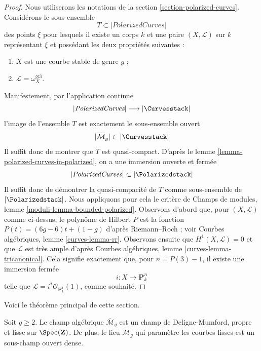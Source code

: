 \begin{proof}
Nous utiliserons les notations de la section \ref{section-polarized-curves}.
Considérons le sous-ensemble
$$
T \subset |\textit{PolarizedCurves}|
$$
des points $\xi$ pour lesquels il existe un corps $k$ et une paire
$(X, \mathcal{L})$ sur $k$ représentant $\xi$
et possédant les deux propriétés suivantes :
\begin{enumerate}
\item $X$ est une courbe stable de genre $g$ ;
\item $\mathcal{L} = \omega_X^{\otimes 3}$.
\end{enumerate}
Manifestement, par l'application continue
$$
|\textit{PolarizedCurves}|
\longrightarrow
|\Curvesstack|
$$
l'image de l'ensemble $T$ est exactement le sous-ensemble ouvert
$$
|\overline{\mathcal{M}}_g| \subset |\Curvesstack|
$$
Il suffit donc de montrer que $T$ est quasi-compact.
D'après le lemme \ref{lemma-polarized-curves-in-polarized}, on a une
immersion ouverte et fermée
$$
|\textit{PolarizedCurves}| \subset |\Polarizedstack|
$$
Il suffit donc de démontrer la quasi-compacité de $T$ comme sous-ensemble de
$|\Polarizedstack|$. Nous appliquons pour cela le critère de
Champs de modules, lemme \ref{moduli-lemma-bounded-polarized}.
Observons d'abord que, pour $(X, \mathcal{L})$
comme ci-dessus, le polynôme de Hilbert $P$ est la fonction
$P(t) = (6g - 6)t + (1 - g)$ d'après Riemann--Roch ; voir
Courbes algébriques, lemme \ref{curves-lemma-rr}.
Observons ensuite que $H^1(X, \mathcal{L}) = 0$
et que $\mathcal{L}$ est très ample d'après
Courbes algébriques, lemme \ref{curves-lemma-tricanonical}.
Cela signifie exactement que, pour $n = P(3) - 1$,
il existe une immersion fermée
$$
i : X \longrightarrow \mathbf{P}^n_k
$$
telle que $\mathcal{L} = i^*\mathcal{O}_{\mathbf{P}^1_k}(1)$,
comme souhaité.
\end{proof}

\noindent
Voici le théorème principal de cette section.

\begin{theorem}
\label{theorem-stable-smooth-proper}
Soit $g \geq 2$. Le champ algébrique $\overline{\mathcal{M}}_g$ est un
champ de Deligne-Mumford, propre et lisse sur $\Spec(\mathbf{Z})$.
De plus, le lieu $\mathcal{M}_g$ qui paramètre les courbes lisses
est un sous-champ ouvert dense.
\end{theorem}

